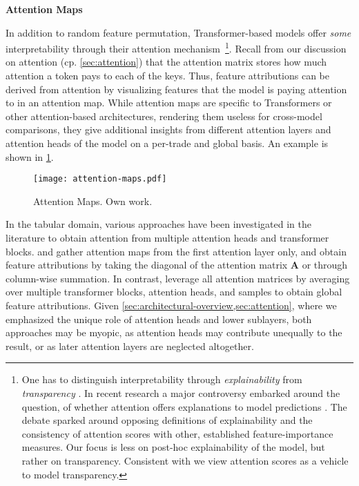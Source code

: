 \textbf{Attention Maps}

In addition to random feature permutation, Transformer-based models offer \emph{some} interpretability through their attention mechanism~\footnote{One has to distinguish interpretability through \emph{explainability} from \emph{transparency} \autocite[][4--5]{liptonMythosModelInterpretability2017}. In recent research a major controversy embarked around the question, of whether attention offers explanations to model predictions \autocites[cp.][150]{bastingsElephantInterpretabilityRoom2020}[][5--7]{jainAttentionNotExplanation2019}[][9]{wiegreffeAttentionNotNot2019}. The debate sparked around opposing definitions of explainability and the consistency of attention scores with other, established feature-importance measures. Our focus is less on post-hoc explainability of the model, but rather on transparency. Consistent with \textcite[][8]{wiegreffeAttentionNotNot2019} we view attention scores as a vehicle to model transparency.
}. Recall from our discussion on attention (cp. \cref{sec:attention}) that the attention matrix stores how much attention a token pays to each of the keys. Thus, feature attributions can be derived from attention by visualizing features that the model is paying attention to in an attention map. While attention maps are specific to Transformers or other attention-based architectures, rendering them useless for cross-model comparisons, they give additional insights from different attention layers and attention heads of the model on a per-trade and global basis. An example is shown in \cref{fig:attention-maps}.

\begin{figure}[ht]
\centering
\texttt{[image: attention-maps.pdf]}
\caption[Attention Maps]{Attention Maps. Own work.}
\label{fig:attention-maps}
\end{figure}

In the tabular domain, various approaches have been investigated in the literature to obtain attention from multiple attention heads and transformer blocks. \textcite[][18]{somepalliSAINTImprovedNeural2021} and \textcite[][11]{borisovDeepNeuralNetworks2022} gather attention maps from the first attention layer only, and \textcite[][11]{borisovDeepNeuralNetworks2022} obtain feature attributions by taking the diagonal of the attention matrix $\boldsymbol{A}$ or through column-wise summation. In contrast, \textcite[][10]{gorishniyRevisitingDeepLearning2021} leverage all attention matrices by averaging over multiple transformer blocks, attention heads, and samples to obtain global feature attributions. Given \cref{sec:architectural-overview,sec:attention}, where we emphasized the unique role of attention heads and lower sublayers, both approaches may be myopic, as attention heads may contribute unequally to the result, or as later attention layers are neglected altogether.

